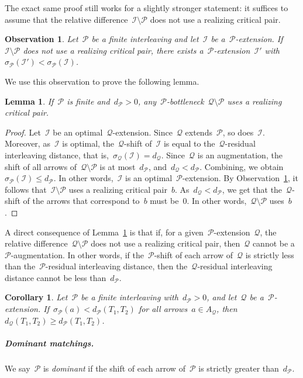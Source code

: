 \documentclass[11pt]{article}
\newtheorem{lemma}[theorem]{Lemma}
\newtheorem{corollary}[theorem]{Corollary}
\newtheorem{observation}[theorem]{Observation}
\newcommand{\shift}[1]{\sigma_{#1}}
\newcommand{\resdist}[1]{d_{#1}}
\newcommand{\I}{\mathcal{I}}
\renewcommand{\P}{\mathcal{P}}
\newcommand{\Q}{\mathcal{Q}}
\begin{document}
The exact same proof still works for a slightly stronger statement: it suffices to assume that the relative difference~$\I \setminus \P$ does not use a realizing critical pair.
\begin{observation}\label{obs:realizing-critical-pair}
Let~$\P$ be a finite interleaving and let~$\I$ be a~$\P$-extension.
If~$\I \setminus \P$ does not use a realizing critical pair, there exists a~$\P$-extension~$\I'$ with~$\shift{\P}(\I') < \shift{\P}(\I)$.
\end{observation}
We use this observation to prove the following lemma.
%
\begin{lemma}\label{lem:bottleneck-critical-pair}
    If~$\P$ is finite and~$\resdist{\P} > 0$, any~$\P$-bottleneck~$\Q \setminus \P$ uses a realizing critical pair.
\end{lemma}
\begin{proof}
    Let~$\I$ be an optimal~$\Q$-extension.
    Since~$\Q$ extends~$\P$, so does~$\I$.
    Moreover, as~$\I$ is optimal, the~$\Q$-shift of~$\I$ is equal to the~$\Q$-residual interleaving distance, that is,~$\shift{\Q}(\I) = \resdist{\Q}$.
    Since~$\Q$ is an augmentation, the shift of all arrows of~$\Q \setminus \P$ is at most~$\resdist{\P}$, and~$\resdist{\Q} < \resdist{\P}$.
    Combining, we obtain~$\shift{\P}(\I) \le \resdist{\P}$.
    In other words,~$\I$ is an optimal~$\P$-extension.
    By Observation~\ref{obs:realizing-critical-pair}, it follows that~$\I \setminus \P$ uses a realizing critical pair~$b$.
    As~$\resdist{\Q} < \resdist{\P}$, we get that the~$\Q$-shift of the arrows that correspond to~$b$ must be~$0$.
    In other words,~$\Q \setminus \P$ uses~$b$.
\end{proof}
%
%
\noindent
A direct consequence of Lemma~\ref{lem:bottleneck-critical-pair} is that if, for a given~$\P$-extension~$\Q$, the relative difference~$\Q \setminus \P$ does not use a realizing critical pair, then~$\Q$ cannot be a~$\P$-augmentation.
In other words, if the~$\P$-shift of each arrow of~$\Q$ is strictly less than the~$\P$-residual interleaving distance, then the~$\Q$-residual interleaving distance cannot be less than~$\resdist{\P}$.
%
\begin{corollary}\label{cor:helper-lemma}
    Let~$\P$ be a finite interleaving with~$\resdist{\P} > 0$, and let~$\Q$ be a~$\P$-extension.
    If~$\shift{\P}(a) < \resdist{\P}(T_1, T_2)$ for all arrows~$a \in A_\Q$, then $\resdist{\Q}(T_1, T_2) \ge \resdist{\P}(T_1, T_2)$.
\end{corollary}
%
\subparagraph{Dominant matchings.}
We say~$\P$ is \emph{dominant} if the shift of each arrow of~$\P$ is strictly greater than~$\resdist{\P}$.
\end{document}
